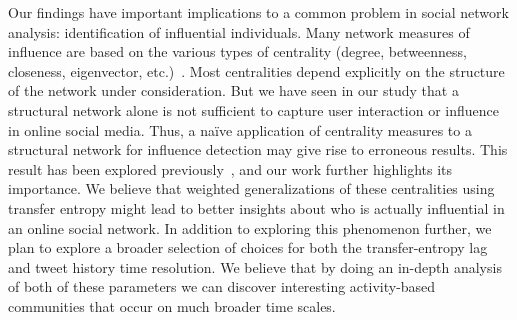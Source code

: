 Our findings have important implications to a common problem in social network analysis: identification of influential individuals. Many network measures of influence are based on the various types of centrality (degree, betweenness, closeness, eigenvector, etc.)~\cite{newman2009networks}. Most centralities depend explicitly on the structure of the network under consideration. But we have seen in our study that a structural network alone is not sufficient to capture user interaction or influence in online social media. Thus, a na\"ive application of centrality measures to a structural network for influence detection may give rise to erroneous results. This result has been explored previously~\cite{kitsak2010identification}, and our work further highlights its importance. We believe that weighted generalizations of these centralities using transfer entropy might lead to better insights about who is actually influential in an online social network. In addition to exploring this phenomenon further, we plan to explore a broader selection of choices for both the transfer-entropy lag and tweet history time resolution. We believe that by doing an in-depth analysis of both of these parameters we can discover interesting activity-based communities that occur on much broader time scales.











